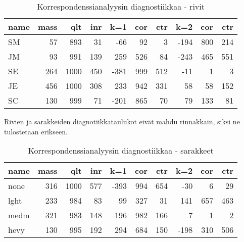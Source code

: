 \documentclass[finnish,]{book}
\newenvironment{Shaded}{\begin{snugshade}}{\end{snugshade}}
\newcommand{\DataTypeTok}[1]{\textcolor[rgb]{0.13,0.29,0.53}{#1}}
\newcommand{\DecValTok}[1]{\textcolor[rgb]{0.00,0.00,0.81}{#1}}
\newcommand{\KeywordTok}[1]{\textcolor[rgb]{0.13,0.29,0.53}{\textbf{#1}}}
\newcommand{\NormalTok}[1]{#1}
\newcommand{\OperatorTok}[1]{\textcolor[rgb]{0.81,0.36,0.00}{\textbf{#1}}}
\newcommand{\OtherTok}[1]{\textcolor[rgb]{0.56,0.35,0.01}{#1}}
\newcommand{\StringTok}[1]{\textcolor[rgb]{0.31,0.60,0.02}{#1}}
\theoremstyle{definition}
\theoremstyle{definition}
\theoremstyle{definition}
\theoremstyle{remark}
\begin{document}
\begin{table}

\caption{\label{tab:simpleCAtab1}Korrespondenssianalyysin diagnostiikkaa - rivit}
\centering
\begin{tabular}[t]{lrrrrrrrrr}
\toprule
name & mass &  qlt &  inr &  k=1 & cor & ctr &  k=2 & cor & ctr\\
\midrule
SM & 57 & 893 & 31 & -66 & 92 & 3 & -194 & 800 & 214\\
JM & 93 & 991 & 139 & 259 & 526 & 84 & -243 & 465 & 551\\
SE & 264 & 1000 & 450 & -381 & 999 & 512 & -11 & 1 & 3\\
JE & 456 & 1000 & 308 & 233 & 942 & 331 & 58 & 58 & 152\\
SC & 130 & 999 & 71 & -201 & 865 & 70 & 79 & 133 & 81\\
\bottomrule
\end{tabular}
\end{table}

Rivien ja sarakkeiden diagnotiikkataulukot eivät mahdu rinnakkain, siksi
ne tulostetaan erikseen.

\begin{Shaded}
\end{Shaded}

\begin{table}

\caption{\label{tab:simpleCAtab2}Korrespondenssianalyysin diagnostiikkaa - sarakkeet}
\centering
\begin{tabular}[t]{lrrrrrrrrr}
\toprule
name & mass &  qlt &  inr &  k=1 & cor & ctr &  k=2 & cor & ctr\\
\midrule
none & 316 & 1000 & 577 & -393 & 994 & 654 & -30 & 6 & 29\\
lght & 233 & 984 & 83 & 99 & 327 & 31 & 141 & 657 & 463\\
medm & 321 & 983 & 148 & 196 & 982 & 166 & 7 & 1 & 2\\
hevy & 130 & 995 & 192 & 294 & 684 & 150 & -198 & 310 & 506\\
\bottomrule
\end{tabular}
\end{table}
\end{document}
